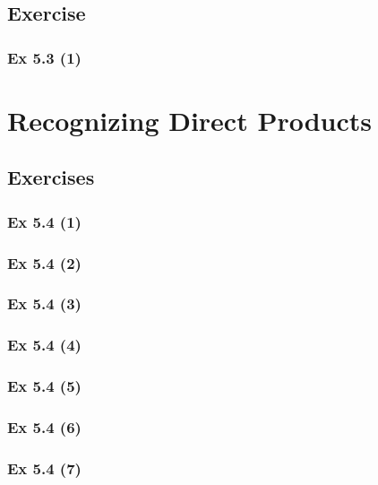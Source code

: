 \subsection*{Exercise}\label{sec:5.3_Exercise}

\subsubsection{Ex 5.3 (1)}\label{sec:Ex_5.3.1}

\section{Recognizing Direct Products}\label{sec:5.4}	
\subsection*{Exercises}\label{sec:5.4_Exercises}

\subsubsection{Ex 5.4 (1)}\label{sec:Ex_5.4.1}

\subsubsection{Ex 5.4 (2)}\label{sec:Ex_5.4.2}

\subsubsection{Ex 5.4 (3)}\label{sec:Ex_5.4.3}

\subsubsection{Ex 5.4 (4)}\label{sec:Ex_5.4.4}

\subsubsection{Ex 5.4 (5)}\label{sec:Ex_5.4.5}

\subsubsection{Ex 5.4 (6)}\label{sec:Ex_5.4.6}

\subsubsection{Ex 5.4 (7)}\label{sec:Ex_5.4.7}

